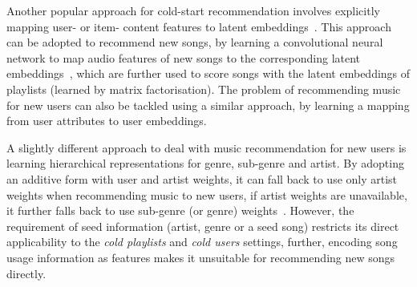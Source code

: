 Another popular approach for cold-start recommendation involves explicitly mapping 
user- or item- content features to latent embeddings~\cite{Gantner:2010}.
This approach can be adopted to recommend new songs, 
\eg by learning a convolutional neural network to map audio features of new songs to 
the corresponding latent embeddings~\cite{van2013deep},
which are further used to score songs with the latent embeddings of playlists (learned by matrix factorisation).
The problem of recommending music for new users can also be tackled using a similar approach, \eg
by learning a mapping from user attributes to user embeddings.

A slightly different approach to deal with music recommendation for new users is learning hierarchical 
representations for genre, sub-genre and artist.
By adopting an additive form with user and artist weights, it can fall back to use only artist weights
when recommending music to new users, if artist weights are unavailable, it further falls back to use 
sub-genre (or genre) weights~\cite{ben2017groove}.
However, the requirement of seed information (\eg artist, genre or a seed song) restricts its direct applicability to
the \emph{cold playlists} and \emph{cold users} settings, %
further, encoding song usage information as features makes it unsuitable 
for recommending new songs directly.
%
%




